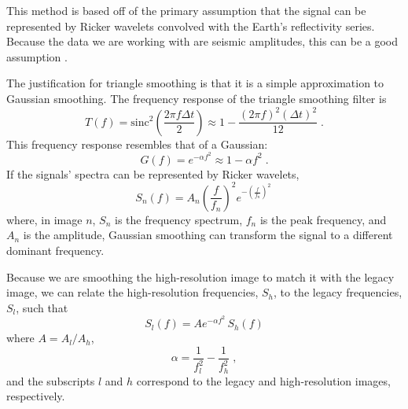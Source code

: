 
        This method is based off of the primary assumption that the signal can be represented by Ricker wavelets convolved with the Earth's reflectivity series.
        Because the data we are working with are seismic amplitudes, this can be a good assumption \cite[]{ricker}.

        The justification for triangle smoothing is that it is a simple approximation to Gaussian smoothing. 
        The frequency response of the triangle smoothing filter \cite[]{pvi} is
        \begin{equation}
            \label{eq:Tf}
            T(f) = \mathrm{sinc}^2\left(\frac{2\pi f \Delta t}{2}\right) \approx 1-\frac{(2\pi f)^2(\Delta t)^2}{12}\;.
        \end{equation}
        This frequency response resembles that of a Gaussian:
        \begin{equation}
            \label{eq:gaussian}
            G(f) = e^{-\alpha f^2} \approx 1 - \alpha f^2\;.
        \end{equation}
        If the signals' spectra can be represented by Ricker wavelets,
        \begin{equation} 
            \label{eq:Sn}
            S_{n}(f) = A_{n} \left(\frac{f}{f_{n}}\right)^2e^{-\left(\frac{f}{f_{n}}\right)^{2}}\,
        \end{equation}
        where, in image $n$, $S_n$ is the frequency spectrum, $f_n$ is the peak frequency, and $A_n$ is the amplitude, Gaussian smoothing can transform the signal to a different dominant frequency.
        
        Because we are smoothing the high-resolution image to match it with the legacy image, we can relate the high-resolution frequencies, $S_h$, to the legacy frequencies, $S_l$, such that
        \begin{equation} 
            \label{eq:smooth}
            S_{l}(f)=A e^{-\alpha f^2}\,S_h(f)      
        \end{equation}
        where $A=A_l/A_h$,
        \begin{equation}
            \label{eq:alpha}
            \alpha = \frac{1}{f_l^2}-\frac{1}{f_h^2} \;,
        \end{equation}
        and the subscripts $l$ and $h$ correspond to the legacy and high-resolution images, respectively.
        
